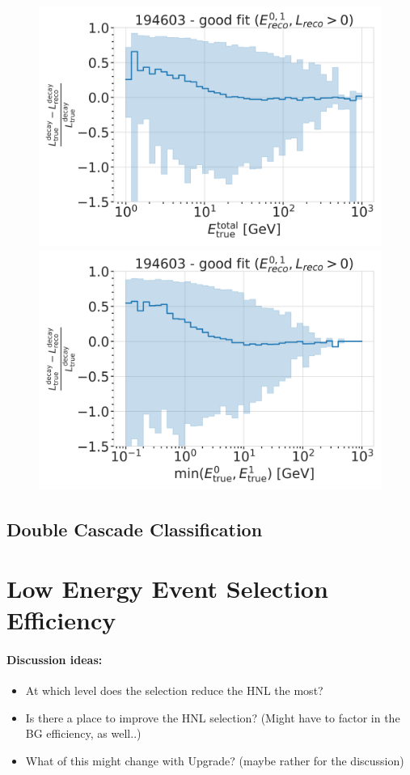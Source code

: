 \begin{figure}[h]
	\centering
    \includegraphics[width=0.49\linewidth]{figures/model_independent_simulation/results/realistic/resolutions/194603_median_decay_length_bias_vs_tot_energy_goodfit_log_unweighted.png}
    \includegraphics[width=0.49\linewidth]{figures/model_independent_simulation/results/realistic/resolutions/194603_median_decay_length_bias_vs_min_energy_goodfit_log_unweighted.png} 
    \caption[]{}
\end{figure}


\subsection{Double Cascade Classification}





\section{Low Energy Event Selection Efficiency}


\paragraph{Discussion ideas:}
\begin{itemize}
    \item At which level does the selection reduce the HNL the most?
    \item Is there a place to improve the HNL selection? (Might have to factor in the BG efficiency, as well..)
    \item What of this might change with Upgrade? (maybe rather for the discussion)
\end{itemize}
